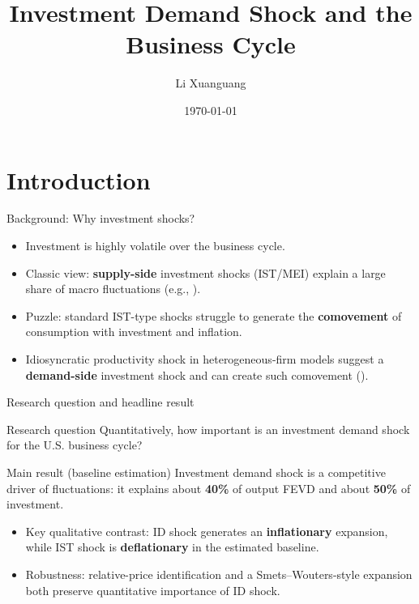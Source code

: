 \documentclass[10pt]{beamer}
\title{Investment Demand Shock and the Business Cycle}
\author{Li Xuanguang}
\date{\today}
\begin{document}
\begin{frame}
	\titlepage
\end{frame}

\section{Introduction}

\begin{frame}{Background: Why investment shocks?}
	\begin{itemize}
		\item Investment is highly volatile over the business cycle.
		\item Classic view: \textbf{supply-side} investment shocks (IST/MEI) explain a large share of macro fluctuations
			(e.g., \citealp{greenwoodInvestmentCapacityUtilization1988, fisherDynamicEffectsNeutral2006, justinianoInvestmentShocksBusiness2010}).
		\item Puzzle: standard IST-type shocks struggle to generate the \textbf{comovement} of consumption with investment and inflation.
		\item Idiosyncratic productivity shock in heterogeneous-firm models suggest a \textbf{demand-side} investment shock and can create such comovement (\citealp{nireiOriginsPropagationAnimal}).
	\end{itemize}
\end{frame}

\begin{frame}{Research question and headline result}
	\begin{block}{Research question}
		Quantitatively, how important is an investment demand shock for the U.S. business cycle?
	\end{block}

	\vspace{0.4em}
	\begin{block}{Main result (baseline estimation)}
		Investment demand shock is a competitive driver of fluctuations: it explains about \textbf{40\%} of output FEVD and about \textbf{50\%} of investment.
	\end{block}

	\vspace{0.4em}
	\begin{itemize}
		\item Key qualitative contrast: ID shock generates an \textbf{inflationary} expansion, while IST shock is \textbf{deflationary} in the estimated baseline.
		\item Robustness: relative-price identification and a Smets--Wouters-style expansion both preserve quantitative importance of ID shock.
	\end{itemize}
\end{frame}
\end{document}
